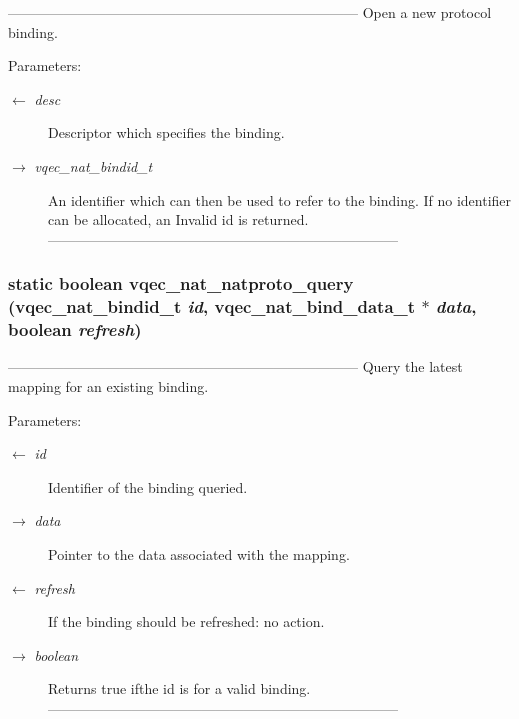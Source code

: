 --------------------------------------------------------------------------- Open a new protocol binding.

\begin{Desc}
\item[Parameters:]
\begin{description}
\item[\mbox{$\leftarrow$} {\em desc}]Descriptor which specifies the binding. \item[\mbox{$\rightarrow$} {\em vqec\_\-nat\_\-bindid\_\-t}]An identifier which can then be used to refer to the binding. If no identifier can be allocated, an Invalid id is returned. --------------------------------------------------------------------------- \end{description}
\end{Desc}
\subsubsection{\setlength{\rightskip}{0pt plus 5cm}static boolean vqec\_\-nat\_\-natproto\_\-query (vqec\_\-nat\_\-bindid\_\-t {\em id}, vqec\_\-nat\_\-bind\_\-data\_\-t $\ast$ {\em data}, boolean {\em refresh})\hspace{0.3cm}{\tt  [static]}}\label{vqec__nat__natproto_8c_4217456fc0436004935341d52881c419}


--------------------------------------------------------------------------- Query the latest mapping for an existing binding.

\begin{Desc}
\item[Parameters:]
\begin{description}
\item[\mbox{$\leftarrow$} {\em id}]Identifier of the binding queried. \item[\mbox{$\rightarrow$} {\em data}]Pointer to the data associated with the mapping. \item[\mbox{$\leftarrow$} {\em refresh}]If the binding should be refreshed: no action. \item[\mbox{$\rightarrow$} {\em boolean}]Returns true ifthe id is for a valid binding. --------------------------------------------------------------------------- \end{description}
\end{Desc}
